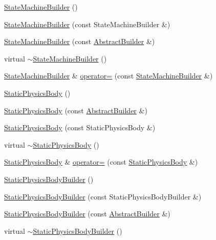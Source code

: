 \begin{DoxyCompactItemize}
\item 
\hyperlink{namespacejli_a2741aa0af34261449ffb4e682da8da60}{State\+Machine\+Builder} ()
\item 
\hyperlink{namespacejli_a1d402cd86e45b64067f92d2de20fa40e}{State\+Machine\+Builder} (const State\+Machine\+Builder \&)
\item 
\hyperlink{namespacejli_a7f6d0afcc738da76220f8c684470ca9d}{State\+Machine\+Builder} (const \hyperlink{classjli_1_1_abstract_builder}{Abstract\+Builder} \&)
\item 
virtual \hyperlink{namespacejli_aea2716e299add44b8e1341fe4935a9c3}{$\sim$\+State\+Machine\+Builder} ()
\item 
\hyperlink{namespacejli_a2741aa0af34261449ffb4e682da8da60}{State\+Machine\+Builder} \& \hyperlink{namespacejli_a74af49a3892d7ef3e0306ade05373ae3}{operator=} (const \hyperlink{namespacejli_a2741aa0af34261449ffb4e682da8da60}{State\+Machine\+Builder} \&)
\item 
\hyperlink{namespacejli_ad822c5d839081469262a5ecfb9e43300}{Static\+Physics\+Body} ()
\item 
\hyperlink{namespacejli_aa3b66cd0bcb85cde0b026378b8698ced}{Static\+Physics\+Body} (const \hyperlink{classjli_1_1_abstract_builder}{Abstract\+Builder} \&)
\item 
\hyperlink{namespacejli_a1ecd15da820fd35a39a0ca4cfbadc8a6}{Static\+Physics\+Body} (const Static\+Physics\+Body \&)
\item 
virtual \hyperlink{namespacejli_a8c77bdf3068b35d9b32d161af44526fb}{$\sim$\+Static\+Physics\+Body} ()
\item 
\hyperlink{namespacejli_ad822c5d839081469262a5ecfb9e43300}{Static\+Physics\+Body} \& \hyperlink{namespacejli_a1d3143a4538bad208106f20802c61410}{operator=} (const \hyperlink{namespacejli_ad822c5d839081469262a5ecfb9e43300}{Static\+Physics\+Body} \&)
\item 
\hyperlink{namespacejli_a61d1e7bbc9ec250a28840043945bacf6}{Static\+Physics\+Body\+Builder} ()
\item 
\hyperlink{namespacejli_a288d8c8251dd2f9bb8c0ca98f2ce1511}{Static\+Physics\+Body\+Builder} (const Static\+Physics\+Body\+Builder \&)
\item 
\hyperlink{namespacejli_a1deaebc549d4295ebb15599ea42c2886}{Static\+Physics\+Body\+Builder} (const \hyperlink{classjli_1_1_abstract_builder}{Abstract\+Builder} \&)
\item 
virtual \hyperlink{namespacejli_a3d75417d1f7a0f1d49f63e50786ba350}{$\sim$\+Static\+Physics\+Body\+Builder} ()
\item 

\end{DoxyCompactItemize}
